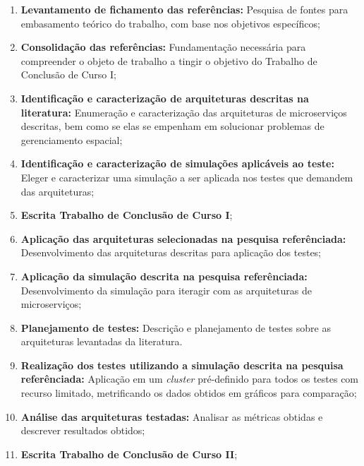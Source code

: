 \begin{enumerate}
  \item \textbf{Levantamento de fichamento das referências:} Pesquisa de fontes para embasamento teórico do trabalho, com base nos objetivos específicos;

  \item \textbf{Consolidação das referências:} Fundamentação necessária para compreender o objeto de trabalho a tingir o objetivo do Trabalho de Conclusão de Curso I;

  \item \textbf{Identificação e caracterização de arquiteturas descritas na literatura:} Enumeração e caracterização das arquiteturas de microserviços descritas, bem como se elas se empenham em solucionar problemas de gerenciamento espacial;

  \item \textbf{Identificação e caracterização de simulações aplicáveis ao teste:} Eleger e caracterizar uma simulação a ser aplicada nos testes que demandem das arquiteturas;

  \item \textbf{Escrita Trabalho de Conclusão de Curso I};

  \item \textbf{Aplicação das arquiteturas selecionadas na pesquisa referênciada:} Desenvolvimento das arquiteturas descritas para aplicação dos testes;

  \item \textbf{Aplicação da simulação descrita na pesquisa referênciada:} Desenvolvimento da simulação para iteragir com as arquiteturas de microserviços;

  \item \textbf{Planejamento de testes:} Descrição e planejamento de testes sobre as arquiteturas levantadas da literatura.

  \item \textbf{Realização dos testes utilizando a simulação descrita na pesquisa referênciada:} Aplicação em um \textit{cluster} pré-definido para todos os testes com recurso limitado, metrificando os dados obtidos em gráficos para comparação;

  \item \textbf{Análise das arquiteturas testadas:} Analisar as métricas obtidas e descrever resultados obtidos;

  \item \textbf{Escrita Trabalho de Conclusão de Curso II};
\end{enumerate}
